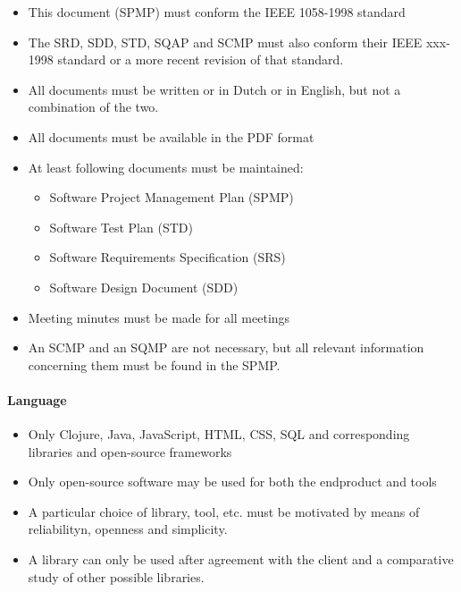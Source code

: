 \documentclass[12pt]{article}
\begin{document}
\begin{itemize}
\itemsep1pt\parskip0pt
\item
  This document (SPMP) must conform the IEEE 1058-1998 standard
\item
  The SRD, SDD, STD, SQAP and SCMP must also conform their IEEE xxx-1998
  standard or a more recent revision of that standard.
\item
  All documents must be written or in Dutch or in English, but not a
  combination of the two.
\item
  All documents must be available in the PDF format
\item
  At least following documents must be maintained:

  \begin{itemize}
  \itemsep1pt\parskip0pt
  \item
    Software Project Management Plan (SPMP)
  \item
    Software Test Plan (STD)
  \item
    Software Requirements Specification (SRS)
  \item
    Software Design Document (SDD)
  \end{itemize}
\item
  Meeting minutes must be made for all meetings
\item
  An SCMP and an SQMP are not necessary, but all relevant information
  concerning them must be found in the SPMP.
\end{itemize}

\paragraph{Language}\label{language}

\begin{itemize}
\itemsep1pt\parskip0pt
\item
  Only Clojure, Java, JavaScript, HTML, CSS, SQL and corresponding
  libraries and open-source frameworks
\item
  Only open-source software may be used for both the endproduct and
  tools
\item
  A particular choice of library, tool, etc. must be motivated by means
  of reliabilityn, openness and simplicity.
\item
  A library can only be used after agreement with the client and a
  comparative study of other possible libraries.
\end{itemize}
\end{document}
